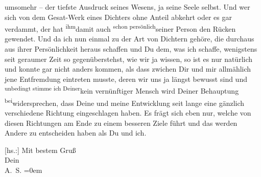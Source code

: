                umsomehr – der tiefste Ausdruck seines Wesens, ja seine Seele selbst. Und wer sich
               von dem \introOben{}Gesa{\geminationm}t-\introOben{}Werk eines
               Dichters ohne Anteil abkehrt oder es gar verdammt, der hat \substVorne{}\textsuperscript{ihm}\substDazwischen{}damit\substHinten{} auch \substVorne{}\textsuperscript{schon persönlich}\substDazwischen{}seiner Person\substHinten{} den Rücken gewendet. Und da ich nun einmal zu der Art von Dichtern gehöre,
               die  durchaus aus ihrer Persönlichkeit heraus schaffen und Du dem, was
               ich schaffe, wenigstens seit geraumer Zeit so gegenüberstehst, wie wir ja wissen, so
               ist es nur natürlich und konnte gar nicht anders kommen, als dass zwichen Dir und mir
               allmählich {\pb}jene Entfremdung eintreten
               musste, deren wir uns ja längst bewusst sind und \substVorne{}\textsuperscript{unbedingt stimme ich Deiner}\substDazwischen{}kein vernünftiger Mensch wird Deiner\substHinten{} Behauptung \substVorne{}\textsuperscript{bei}\substDazwischen{}widersprechen\substHinten{}, dass Deine und meine Entwicklung seit lange eine gänzlich verschiedene
               Richtung eingeschlagen haben. Es frägt sich eben nur, welche von diesen Richtungen am
               Ende zu einem besseren Ziele führt und das werden Andere zu entscheiden haben als Du
               und ich.\pend
           
\pstart
           {[}hs.:{]} Mit bestem Gruß {\\[\baselineskip]}Dein {\\[\baselineskip]}\spacefill\mbox{A. S.}\pend
           \leftskip=0em{}\endnumbering{}  \newcommand{\dateiname}{L03521}\newcommand{\titel}{Arthur Schnitzler an Paul Goldmann, 1. 2. 1911}\newcommand{\editorInnen}{Martin Anton Müller und Laura Untner}
